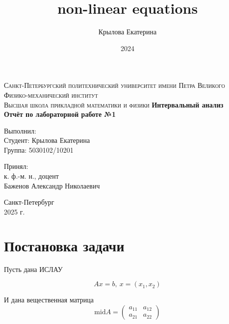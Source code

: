 \documentclass[a4paper,14pt]{article}
\title{non-linear equations}
\author{Крылова Екатерина}
\date{2024}
\begin{document}
	
	\begin{titlepage}
		\begin{center}
			\textsc{
				Санкт-Петербургский политехнический университет имени Петра Великого \\[5mm]
				Физико-механический институт\\[2mm]
				Высшая школа прикладной математики и физики            
			}   
			\vfill
			\textbf{\large
				Интервальный анализ\\
				Отчёт по лабораторной работе №1 \\[3mm]
			}                
		\end{center}
		
		\vfill
		\hfill
		\begin{minipage}{0.5\textwidth}
			Выполнил: \\[2mm]   
			Студент: Крылова Екатерина \\
			Группа: 5030102/10201\\
		\end{minipage}
		
		\hfill
		\begin{minipage}{0.5\textwidth}
			Принял: \\[2mm]
			к. ф.-м. н., доцент \\   
			Баженов Александр Николаевич
		\end{minipage}
		
		\vfill
		\begin{center}
			Санкт-Петербург \\2025 г.
		\end{center}
	\end{titlepage}
	
	\tableofcontents
	\newpage
	
	\section{Постановка задачи}
	Пусть дана ИСЛАУ

	\[
		Ax = b, \ x = (x_1, x_2)
	\]

	И дана вещественная матрица
	\begin{equation}\text{mid} A = 
		\begin{pmatrix}
			a_{11} & a_{12}\\ 
			a_{21} & a_{22}
		\end{pmatrix}
	\end{equation}
\end{document}
